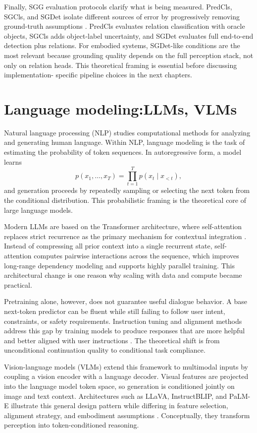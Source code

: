   Finally, SGG evaluation protocols clarify what is being measured. PredCls, SGCls, and SGDet isolate different sources of error by progressively removing ground-truth assumptions \cite{zhu_scene_2022}.
  PredCls evaluates relation classification with oracle objects, SGCls adds object-label uncertainty, and SGDet evaluates full end-to-end detection plus relations. For embodied systems, SGDet-like
  conditions are the most relevant because grounding quality depends on the full perception stack, not only on relation heads. This theoretical framing is essential before discussing implementation-
  specific pipeline choices in the next chapters.

  \section{Language modeling:\@ LLMs, VLMs}

  Natural language processing (NLP) studies computational methods for analyzing and generating human language. Within NLP, language modeling is the task of estimating the probability of token sequences.
  In autoregressive form, a model learns
  \[
  p(x_1,\dots,x_T)=\prod_{t=1}^{T} p(x_t \mid x_{<t}),
  \]
  and generation proceeds by repeatedly sampling or selecting the next token from the conditional distribution. This probabilistic framing is the theoretical core of large language models.

  Modern LLMs are based on the Transformer architecture, where self-attention replaces strict recurrence as the primary mechanism for contextual integration \cite{vaswani2023attentionneed}. Instead of
  compressing all prior context into a single recurrent state, self-attention computes pairwise interactions across the sequence, which improves long-range dependency modeling and supports highly
  parallel training. This architectural change is one reason why scaling with data and compute became practical.

  Pretraining alone, however, does not guarantee useful dialogue behavior. A base next-token predictor can be fluent while still failing to follow user intent, constraints, or safety requirements.
  Instruction tuning and alignment methods address this gap by training models to produce responses that are more helpful and better aligned with user instructions
  \cite{ouyang2022traininglanguagemodelsfollow}. The theoretical shift is from unconditional continuation quality to conditional task compliance.

  Vision-language models (VLMs) extend this framework to multimodal inputs by coupling a vision encoder with a language decoder. Visual features are projected into the language model token space, so
  generation is conditioned jointly on image and text context. Architectures such as LLaVA, InstructBLIP, and PaLM-E illustrate this general design pattern while differing in feature selection, alignment
  strategy, and embodiment assumptions \cite{liu_visual_2023,dai_instructblip_2023,driess_palm-e_2023}. Conceptually, they transform perception into token-conditioned reasoning.

